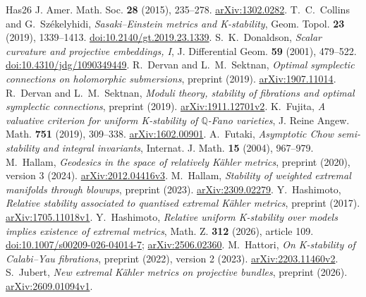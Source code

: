\documentclass[12pt]{amsart}
\theoremstyle{definition}
\theoremstyle{remark}
\numberwithin{equation}{section}
\newcommand{\Q}{\mathbb{Q}}
\begin{document}
\begin{thebibliography}{Has26}
J. Amer. Math. Soc. \textbf{28} (2015), 235--278.
\href{https://arxiv.org/abs/1302.0282}{arXiv:1302.0282}.
T.~C.~Collins and G.~Székelyhidi,
\emph{Sasaki--Einstein metrics and K-stability},
Geom. Topol. \textbf{23} (2019), 1339--1413.
\href{https://doi.org/10.2140/gt.2019.23.1339}{doi:10.2140/gt.2019.23.1339}.
S.~K.~Donaldson,
\emph{Scalar curvature and projective embeddings, I},
J. Differential Geom. \textbf{59} (2001), 479--522.
\href{https://doi.org/10.4310/jdg/1090349449}{doi:10.4310/jdg/1090349449}.
R.~Dervan and L.~M.~Sektnan,
\emph{Optimal symplectic connections on holomorphic submersions},
preprint (2019).
\href{https://arxiv.org/abs/1907.11014}{arXiv:1907.11014}.
R.~Dervan and L.~M.~Sektnan,
\emph{Moduli theory, stability of fibrations and optimal symplectic connections},
preprint (2019).
\href{https://arxiv.org/abs/1911.12701v2}{arXiv:1911.12701v2}.
K.~Fujita,
\emph{A valuative criterion for uniform K-stability of $\Q$-Fano varieties},
J. Reine Angew. Math. \textbf{751} (2019), 309--338.
\href{https://arxiv.org/abs/1602.00901}{arXiv:1602.00901}.
A.~Futaki,
\emph{Asymptotic Chow semi-stability and integral invariants},
Internat. J. Math. \textbf{15} (2004), 967--979.
M.~Hallam,
\emph{Geodesics in the space of relatively Kähler metrics},
preprint (2020), version 3 (2024).
\href{https://arxiv.org/abs/2012.04416v3}{arXiv:2012.04416v3}.
M.~Hallam,
\emph{Stability of weighted extremal manifolds through blowups},
preprint (2023).
\href{https://arxiv.org/abs/2309.02279}{arXiv:2309.02279}.
Y.~Hashimoto,
\emph{Relative stability associated to quantised extremal Kähler metrics},
preprint (2017).
\href{https://arxiv.org/abs/1705.11018v1}{arXiv:1705.11018v1}.
Y.~Hashimoto,
\emph{Relative uniform K-stability over models implies existence of extremal metrics},
Math. Z. \textbf{312} (2026), article 109.
\href{https://doi.org/10.1007/s00209-026-04014-7}{doi:10.1007/s00209-026-04014-7};
\href{https://arxiv.org/abs/2506.02360}{arXiv:2506.02360}.
M.~Hattori,
\emph{On K-stability of Calabi--Yau fibrations},
preprint (2022), version 2 (2023).
\href{https://arxiv.org/abs/2203.11460v2}{arXiv:2203.11460v2}.
S.~Jubert,
\emph{New extremal Kähler metrics on projective bundles},
preprint (2026).
\href{https://arxiv.org/abs/2609.01094v1}{arXiv:2609.01094v1}.

\end{thebibliography}
\end{document}
